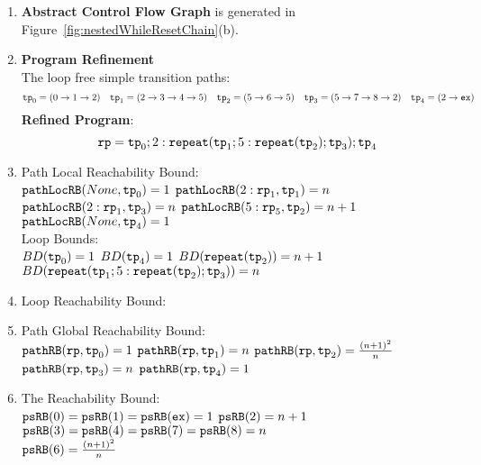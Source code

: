 \begin{enumerate}
  \item  \textbf{Abstract Control Flow Graph} is generated in Figure~\ref{fig:nestedWhileResetChain}(b).

  \item \textbf{Program Refinement}
  \\
  The loop free simple transition paths:
  \[
          \mathtt{tp}_0 = (0 \to 1 \to 2)
          \quad
          \mathtt{tp}_1 = (2 \to 3 \to 4 \to 5)
          \quad           
          \mathtt{tp}_2 = (5 \to 6 \to 5)
          \quad
          \mathtt{tp}_3 = (5 \to 7 \to 8 \to 2)
          \quad
          \mathtt{tp}_4 = (2 \to \mathtt{ex})
      \]
  \textbf{Refined Program}:
  \[
  \mathtt{rp} = \mathtt{tp}_0 ; 2: \mathtt{repeat}(\mathtt{tp}_1; 5: \mathtt{repeat}(\mathtt{tp}_2); \mathtt{tp}_3); \mathtt{tp}_4
  \]
\item {Path Local Reachability Bound}:
\\
$\mathtt{pathLocRB}(None, \mathtt{tp}_0) = 1$ \quad
$\mathtt{pathLocRB}(2: \mathtt{rp}_1, \mathtt{tp}_1) = n$ \quad
$\mathtt{pathLocRB}(2: \mathtt{rp}_1, \mathtt{tp}_3) = n$ \quad
$\mathtt{pathLocRB}(5: \mathtt{rp}_5, \mathtt{tp}_2) = n + 1$ \\
$\mathtt{pathLocRB}(None, \mathtt{tp}_4) = 1$
%
\\
Loop Bounds:
\\
$BD(\mathtt{tp}_0) = 1$
\quad
$BD(\mathtt{tp}_4) = 1$
\quad
$BD(\mathtt{repeat}(\mathtt{tp}_2)) = n + 1 $
\quad
$BD(\mathtt{repeat}(\mathtt{tp}_1; 5: \mathtt{repeat}(\mathtt{tp}_2); \mathtt{tp}_3)) = n $
%
\item Loop Reachability Bound:
\\
%
%
\item Path Global Reachability Bound:
\\
$\mathtt{pathRB}(\mathtt{rp}, \mathtt{tp}_0) = 1$ \quad
$\mathtt{pathRB}(\mathtt{rp}, \mathtt{tp}_1) = n$ \quad
$\mathtt{pathRB}(\mathtt{rp}, \mathtt{tp}_2) = \frac{(n + 1)^2}{n}$ \quad
$\mathtt{pathRB}(\mathtt{rp}, \mathtt{tp}_3) = n$ \quad
$\mathtt{pathRB}(\mathtt{rp}, \mathtt{tp}_4) = 1$
%
\item The Reachability Bound:
\\
$\mathtt{psRB}(0) = \mathtt{psRB}(1) = \mathtt{psRB}(\mathtt{ex}) = 1$ \quad
$\mathtt{psRB}(2) = n + 1$ \quad
$\mathtt{psRB}(3) = \mathtt{psRB}(4) =\mathtt{psRB}(7) = \mathtt{psRB}(8) = n$ \quad \\
$\mathtt{psRB}(6) = \frac{(n + 1)^2}{n} $ \quad
{}
\end{enumerate}